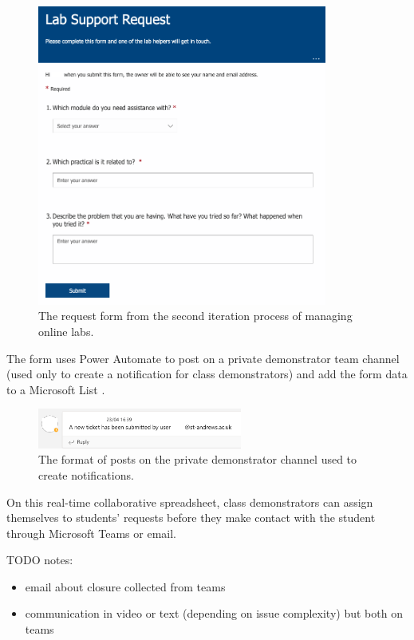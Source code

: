 \documentclass[a4paper,11pt]{article}
\begin{document}
\FloatBarrier
\begin{figure}[H]
  \centering
  \includegraphics[width=0.85\textwidth]{teams2a.png}
  \caption{The request form from the second iteration process of managing online labs.}
\end{figure}

The form uses Power Automate \cite{pauto} to post on a private demonstrator team channel (used only to create a notification for class demonstrators) and add the form data to a Microsoft List \cite{lists}.

\FloatBarrier
\begin{figure}[H]
  \centering
  \includegraphics[width=0.6\textwidth]{teams2b.png}
  \caption{The format of posts on the private demonstrator channel used to create notifications.}
\end{figure}

On this real-time collaborative spreadsheet, class demonstrators can assign themselves to students' requests before they make contact with the student through Microsoft Teams \cite{teams} or email. 

TODO notes:
\begin{itemize}
  \item email about closure collected from teams
  \item communication in video or text (depending on issue complexity) but both on teams
\end{itemize}
\end{document}
